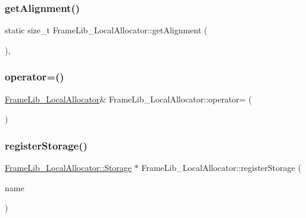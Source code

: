 \subsubsection{\texorpdfstring{get\+Alignment()}{getAlignment()}}
{\footnotesize\ttfamily static size\+\_\+t Frame\+Lib\+\_\+\+Local\+Allocator\+::get\+Alignment (\begin{DoxyParamCaption}{ }\end{DoxyParamCaption})\hspace{0.3cm}{\ttfamily [inline]}, {\ttfamily [static]}}

\mbox{\label{class_frame_lib___local_allocator_ad398ba077e9f04c3508ba5cf5250d01c}} 
\subsubsection{\texorpdfstring{operator=()}{operator=()}}
{\footnotesize\ttfamily \hyperlink{class_frame_lib___local_allocator}{Frame\+Lib\+\_\+\+Local\+Allocator}\& Frame\+Lib\+\_\+\+Local\+Allocator\+::operator= (\begin{DoxyParamCaption}\item[{const \hyperlink{class_frame_lib___local_allocator}{Frame\+Lib\+\_\+\+Local\+Allocator} \&}]{ }\end{DoxyParamCaption})\hspace{0.3cm}{\ttfamily [delete]}}

\mbox{\label{class_frame_lib___local_allocator_a9659c558d40a3c5b41c1d09f293c39bf}} 
\subsubsection{\texorpdfstring{register\+Storage()}{registerStorage()}}
{\footnotesize\ttfamily \hyperlink{class_frame_lib___local_allocator_1_1_storage}{Frame\+Lib\+\_\+\+Local\+Allocator\+::\+Storage} $\ast$ Frame\+Lib\+\_\+\+Local\+Allocator\+::register\+Storage (\begin{DoxyParamCaption}\item[{const char $\ast$}]{name }\end{DoxyParamCaption})}


